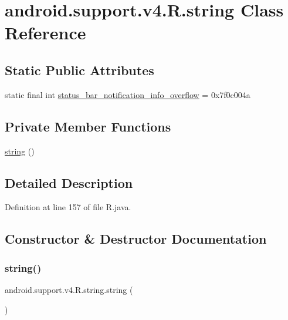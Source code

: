 \hypertarget{classandroid_1_1support_1_1v4_1_1_r_1_1string}{}\section{android.\+support.\+v4.\+R.\+string Class Reference}
\label{classandroid_1_1support_1_1v4_1_1_r_1_1string}
\subsection*{Static Public Attributes}
\begin{DoxyCompactItemize}
\item 
static final int \mbox{\hyperlink{classandroid_1_1support_1_1v4_1_1_r_1_1string_ad88576c15d5591bc789ca0c9f54796d2}{status\+\_\+bar\+\_\+notification\+\_\+info\+\_\+overflow}} = 0x7f0c004a
\end{DoxyCompactItemize}
\subsection*{Private Member Functions}
\begin{DoxyCompactItemize}
\item 
\mbox{\hyperlink{classandroid_1_1support_1_1v4_1_1_r_1_1string_ac2a7d9f630b9b28d2fd08e125169c486}{string}} ()
\end{DoxyCompactItemize}


\subsection{Detailed Description}


Definition at line 157 of file R.\+java.



\subsection{Constructor \& Destructor Documentation}
\mbox{\label{classandroid_1_1support_1_1v4_1_1_r_1_1string_ac2a7d9f630b9b28d2fd08e125169c486}} 
\subsubsection{\texorpdfstring{string()}{string()}}
{\footnotesize\ttfamily android.\+support.\+v4.\+R.\+string.\+string (\begin{DoxyParamCaption}{ }\end{DoxyParamCaption})\hspace{0.3cm}{\ttfamily [private]}}



